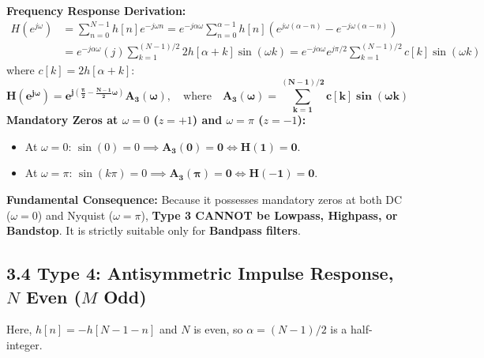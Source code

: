 \documentclass[11pt,a4paper]{article}
\begin{document}
\noindent\textbf{Frequency Response Derivation:}
\begin{align}
H(e^{j\omega}) &= \sum_{n=0}^{N-1} h[n] e^{-j\omega n} = e^{-j\alpha \omega} \sum_{n=0}^{\alpha-1} h[n] \left( e^{j\omega(\alpha - n)} - e^{-j\omega(\alpha - n)} \right) \nonumber \\
&= e^{-j\alpha \omega} (j) \sum_{k=1}^{(N-1)/2} 2h[\alpha + k] \sin(\omega k) = e^{-j\alpha \omega} e^{j\pi/2} \sum_{k=1}^{(N-1)/2} c[k] \sin(\omega k)
\end{align}
where $c[k] = 2h[\alpha + k]$:
\begin{equation}
\mathbf{H(e^{j\omega}) = e^{j\left(\frac{\pi}{2} - \frac{N-1}{2}\omega\right)} A_3(\omega)}, \quad \text{where} \quad \mathbf{A_3(\omega) = \sum_{k=1}^{(N-1)/2} c[k] \sin(\omega k)}
\label{eq:type3_A}
\end{equation}
\textbf{Mandatory Zeros at $\omega = 0$ ($z = +1$) and $\omega = \pi$ ($z = -1$):}
\begin{itemize}
    \item At $\omega = 0$: $\sin(0) = 0 \implies \mathbf{A_3(0) = 0 \iff H(1) = 0}$.
    \item At $\omega = \pi$: $\sin(k\pi) = 0 \implies \mathbf{A_3(\pi) = 0 \iff H(-1) = 0}$.
\end{itemize}
\textbf{Fundamental Consequence:} Because it possesses mandatory zeros at both DC ($\omega = 0$) and Nyquist ($\omega = \pi$), \textbf{Type 3 CANNOT be Lowpass, Highpass, or Bandstop}. It is strictly suitable only for \textbf{Bandpass filters}.

\subsection{3.4 Type 4: Antisymmetric Impulse Response, $N$ Even ($M$ Odd)}
Here, $h[n] = -h[N-1-n]$ and $N$ is even, so $\alpha = (N-1)/2$ is a half-integer.
\end{document}
